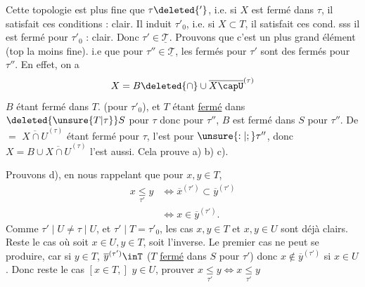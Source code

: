 Cette topologie est plus fine que $\tau\deleted{'}$, i.e. si $X$ est fermé dans $\tau$, il satisfait ces conditions : clair. Il induit $\tau'_0$, i.e. si $X\subset T$, il satisfait ces cond. sss il est fermé pour $\tau'_0$ : clair. Donc $\tau'\in\underline{\mathscr{T}}$. Prouvons que c'est un plus grand élément (top la moins fine). i.e que pour  $\tau''\in\underline{\mathscr{T}}$, les fermés pour $\tau'$ sont des fermés pour $\tau''$. En effet, on a
\[
X=B\deleted{\cap}\cup\overline{X\capU}^{(\tau)}
\]
$B$ étant fermé dans $T$. (pour $\tau'_0$), et $T$ étant \uline{fermé} dans $\deleted{\unsure{T|\tau}}S$ pour $\tau$ donc  pour $\tau''$, $B$ est fermé dans $S$ pour $\tau''$.
De $=$ $\overline{X\cap U}^{(\tau)}$ étant fermé pour $\tau$, l'est pour $\unsure{:|;}\tau''$, donc $X=B\cup\overline{X\cap U}^{(\tau)}$ l'est aussi. Cela prouve a) b) c).

Prouvons d), en nous rappelant que pour $x,y\in T$,
\[
\begin{aligned}
x\underset{\tau'}{\leq}y&\Longleftrightarrow\overline{x}^{(\tau')}\subset\overline{y}^{(\tau')}\\
&\Longleftrightarrow x\in\overline{y}^{(\tau')}.
\end{aligned}
\]
Comme $\tau'\mid U\ne\tau\mid U$, et $\tau'\mid T=\tau'_0$, les cas $x,y\in T$ et $x,y\in U$ sont déjà clairs. Reste le cas où soit $x\in U,y\in T$, soit l'inverse. Le premier cas ne peut se produire, car si $y\in T$, $\overline{y}^{(\tau')}\inT$ ($T$ \uline{fermé} dans $S$ pour $\tau'$) donc $x\notin\overline{y}^{(\tau')}$  si $x\in U$. Donc reste le cas $[x\in T,]$ $y\in U$, prouver $x\underset{\tau'}{\leq}y\Longleftrightarrow x\underset{\tau'}{\leq}y$
